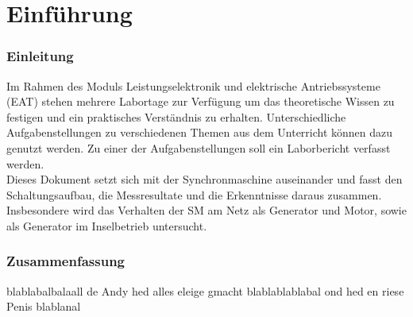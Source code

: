 


\tableofcontents

\newpage
\part{Einführung}

\section{Einleitung}
Im Rahmen des Moduls Leistungselektronik und elektrische Antriebssysteme (EAT) stehen mehrere Labortage zur Verfügung um das theoretische Wissen zu festigen und ein praktisches Verständnis zu erhalten. 
Unterschiedliche Aufgabenstellungen zu verschiedenen Themen aus dem Unterricht können dazu genutzt werden.
Zu einer der Aufgabenstellungen soll ein Laborbericht verfasst werden.\\

Dieses Dokument setzt sich mit der Synchronmaschine auseinander und fasst den Schaltungsaufbau, die Messresultate und die Erkenntnisse daraus zusammen.\\
Insbesondere wird das Verhalten der SM am Netz als Generator und Motor, sowie als Generator im Inselbetrieb untersucht.




\section{Zusammenfassung}

blablabalbalaall de Andy hed alles eleige gmacht blablablablabal ond hed en riese Penis blablanal